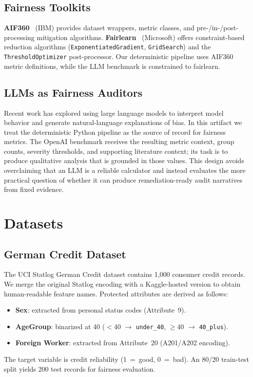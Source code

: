 \documentclass[11pt,a4paper]{article}
\begin{document}
\subsection{Fairness Toolkits}

\textbf{AIF360}~\cite{aif360} (IBM) provides dataset wrappers, metric
classes, and pre-/in-/post-processing mitigation algorithms.
\textbf{Fairlearn}~\cite{fairlearn} (Microsoft) offers constraint-based
reduction algorithms (\texttt{ExponentiatedGradient}, \texttt{GridSearch})
and the \texttt{ThresholdOptimizer} post-processor. Our deterministic
pipeline uses AIF360 metric definitions, while the LLM benchmark is
constrained to fairlearn.

\subsection{LLMs as Fairness Auditors}

Recent work has explored using large language models to interpret model
behavior and generate natural-language explanations of bias. In this artifact
we treat the deterministic Python pipeline as the source of record for
fairness metrics. The OpenAI benchmark receives the resulting metric context,
group counts, severity thresholds, and supporting literature context; its
task is to produce qualitative analysis that is grounded in those values.
This design avoids overclaiming that an LLM is a reliable calculator and
instead evaluates the more practical question of whether it can produce
remediation-ready audit narratives from fixed evidence.

\section{Datasets}

\subsection{German Credit Dataset}

The UCI Statlog German Credit dataset contains 1{,}000 consumer credit
records. We merge the original Statlog encoding with a Kaggle-hosted
version to obtain human-readable feature names. Protected attributes are
derived as follows:
\begin{itemize}[nosep]
  \item \textbf{Sex}: extracted from personal status codes (Attribute~9).
  \item \textbf{AgeGroup}: binarized at 40 ($<$40 $\rightarrow$ \texttt{under\_40}, $\geq$40 $\rightarrow$ \texttt{40\_plus}).
  \item \textbf{Foreign Worker}: extracted from Attribute~20 (A201/A202 encoding).
\end{itemize}
The target variable is credit reliability (1~=~good, 0~=~bad). An 80/20
train-test split yields 200 test records for fairness evaluation.
\end{document}
